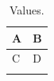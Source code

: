 \documentclass{sn-jnl}
\begin{document}
\begin{table}
\caption{Values.}
\begin{tabular}{ll}
\toprule
A & B\\
\midrule
C & D\\
\botrule
\end{tabular}
\end{table}
\end{document}
